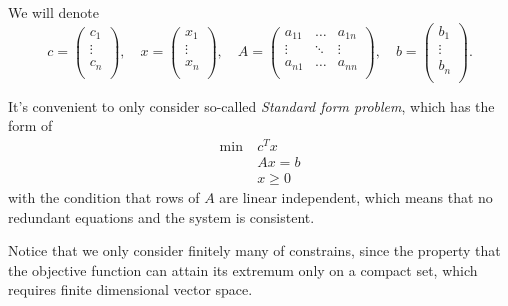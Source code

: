 We will denote
\[
	c= \begin{pmatrix}
		c_1    \\
		\vdots \\
		c_n    \\
	\end{pmatrix},\quad
	x = \begin{pmatrix}
		x_1    \\
		\vdots \\
		x_n    \\
	\end{pmatrix}, \quad
	A = \begin{pmatrix}
		a_{11} & \ldots & a_{1n} \\
		\vdots & \ddots & \vdots \\
		a_{n1} & \ldots & a_{nn} \\
	\end{pmatrix},\quad
	b = \begin{pmatrix}
		b_1    \\
		\vdots \\
		b_n    \\
	\end{pmatrix}.
\]

It's convenient to only consider so-called \emph{Standard form problem}, which has the form of
\begin{align*}
	\min~ & c^Tx    \\
	      & Ax = b  \\
	      & x\geq 0
\end{align*}
with the condition that rows of \(A\) are linear independent, which means that no redundant equations  and the system is consistent.

\begin{remark}
	Notice that we only consider finitely many of constrains, since the property that the objective function can attain its extremum only on a compact set, which
	requires finite dimensional vector space.
\end{remark}

